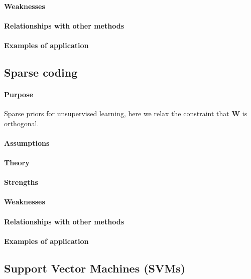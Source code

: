 \paragraph{Weaknesses}
\paragraph{Relationships with other methods}
\paragraph{Examples of application}



\subsection{Sparse coding}
\paragraph{Purpose}
Sparse priors for unsupervised learning, here we relax the constraint that $\bm{W}$
is orthogonal. 
\paragraph{Assumptions}
\paragraph{Theory}
\paragraph{Strengths}
\paragraph{Weaknesses}
\paragraph{Relationships with other methods}
\paragraph{Examples of application}

\subsection{Support Vector Machines (SVMs)}

